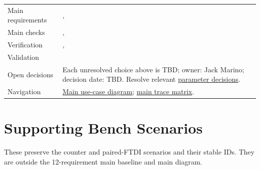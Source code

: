 \begin{tabularx}{\linewidth}{L{3.2cm}Y}
Main requirements & , \\
Main checks & , \\
Verification & , \\
Validation & \\
Open decisions & Each unresolved choice above is TBD; owner: Jack Marino; decision date: TBD. Resolve relevant \hyperref[Table:RequirementParameters]{parameter decisions}.\\
Navigation & \hyperref[Figure:UseCaseDiagram]{Main use-case diagram}; \hyperref[Table:TraceabilityMatrix]{main trace matrix}.\\
\end{tabularx}
\normalsize
\section{Supporting Bench Scenarios}
These preserve the counter and paired-FTDI scenarios and their stable IDs. They are outside the 12-requirement main baseline and main diagram.
